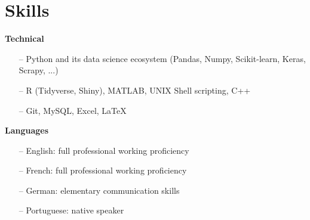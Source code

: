 \section{Skills} 

{\bf Technical} \\
\begin{itemize}
	\item[--] Python and its data science ecosystem (Pandas, Numpy, Scikit-learn, Keras, Scrapy, ...)
	\item[--] R (Tidyverse, Shiny), MATLAB, UNIX Shell scripting, C++
	\item[--] Git, MySQL, Excel, \LaTeX
\end{itemize}

{\bf Languages} \\
\begin{itemize}
	\item[--] English: full professional working proficiency
	\item[--] French: full professional working proficiency
	\item[--] German: elementary communication skills
	\item[--] Portuguese: native speaker
\end{itemize}